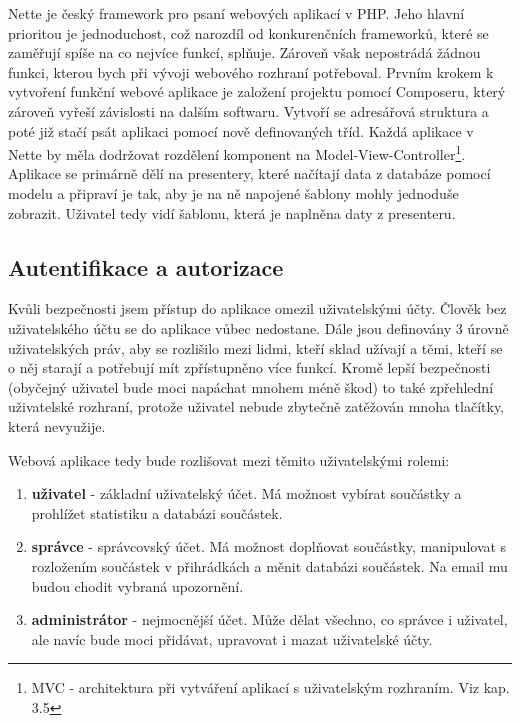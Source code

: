\documentclass[12pt, a4paper, oneside]{article}
\begin{document}
Nette je český framework pro psaní webových aplikací v PHP. Jeho hlavní prioritou je jednoduchost, což narozdíl od konkurenčních frameworků, které se zaměřují spíše na co nejvíce funkcí, splňuje. Zároveň však nepostrádá žádnou funkci, kterou bych při vývoji webového rozhraní potřeboval. Prvním krokem k vytvoření funkční webové aplikace je založení projektu pomocí Composeru, který zároveň vyřeší závislosti na dalším softwaru. Vytvoří se adresářová struktura a poté již stačí psát aplikaci pomocí nově definovaných tříd. Každá aplikace v Nette by měla dodržovat rozdělení komponent na Model-View-Controller\footnote{MVC - architektura při vytváření aplikací s uživatelským rozhraním. Viz kap. 3.5}. Aplikace se primárně dělí na presentery, které načítají data z databáze pomocí modelu a připraví je tak, aby je na ně napojené šablony mohly jednoduše zobrazit. Uživatel tedy vidí šablonu, která je naplněna daty z presenteru.

\subsection{Autentifikace a autorizace}

Kvůli bezpečnosti jsem přístup do aplikace omezil uživatelskými účty. Člověk bez uživatelského účtu se do aplikace vůbec nedostane. Dále jsou definovány 3 úrovně uživatelských práv, aby se rozlišilo mezi lidmi, kteří sklad užívají a těmi, kteří se o něj starají a potřebují mít zpřístupněno více funkcí. Kromě lepší bezpečnosti (obyčejný uživatel bude moci napáchat mnohem méně škod) to také zpřehlední uživatelské rozhraní, protože uživatel nebude zbytečně zatěžován mnoha tlačítky, která nevyužije.

Webová aplikace tedy bude rozlišovat mezi těmito uživatelskými rolemi:

\begin{enumerate}
\item \textbf{uživatel} - základní uživatelský účet. Má možnost vybírat součástky a prohlížet statistiku a databázi součástek.
\item \textbf{správce} - správcovský účet. Má možnost doplňovat součástky, manipulovat s rozložením součástek v přihrádkách a měnit databázi součástek. Na email mu budou chodit vybraná upozornění.
\item \textbf{administrátor} - nejmocnější účet. Může dělat všechno, co správce i uživatel, ale navíc bude moci přidávat, upravovat i mazat uživatelské účty.
\end{enumerate}
\end{document}
